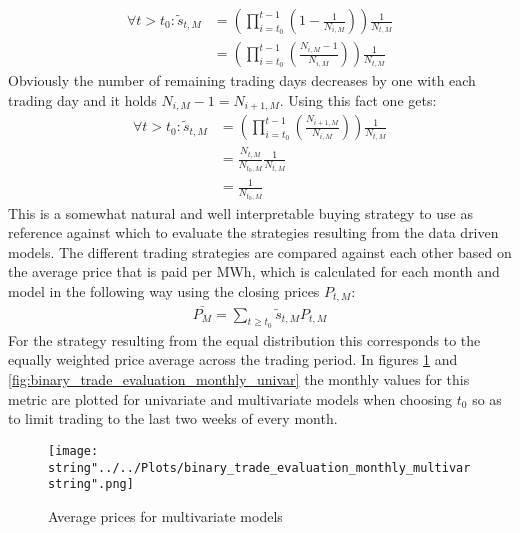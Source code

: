 \begin{align*}
\forall t > t_0: \tilde{s}_{t,M} &= (\prod_{i = t_{0}}^{t-1}(1-\frac{1}{N_{i,M}}))\frac{1}{N_{t,M}}\\
&= (\prod_{i = t_{0}}^{t-1}(\frac{N_{i,M} - 1}{N_{i,M}}))\frac{1}{N_{t,M}}
\end{align*}
Obviously the number of remaining trading days decreases by one with each trading day and it holds $N_{i,M} - 1 = N_{i+1,M}$. Using this fact one gets:
\begin{align*}
\forall t > t_0: \tilde{s}_{t,M}  &= (\prod_{i = t_{0}}^{t-1}(\frac{N_{i+1,M}}{N_{i,M}}))\frac{1}{N_{t,M}} \\
&= \frac{N_{t,M}}{N_{t_0,M}}\frac{1}{N_{t,M}}\\
&= \frac{1}{N_{t_0,M}}
\end{align*}
This is a somewhat natural and well interpretable buying strategy to  use as reference against which to evaluate the strategies resulting from the data driven models.
The different trading strategies are compared against each other based on the average price that is paid per MWh, which is calculated for each month and model in the following way using the closing prices $P_{t,M}$:
\begin{align*}
\bar{P_M} = \sum_{t \geq t_0}\tilde{s}_{t,M}P_{t,M}
\end{align*}
For the strategy resulting from the equal distribution this corresponds to the equally weighted price average across the trading period. In figures \ref{fig:binary_trade_evaluation_monthly_multivar} and \ref{fig:binary_trade_evaluation_monthly_univar} the monthly values for this metric are plotted for univariate and multivariate models when choosing $t_0$ so as to limit trading to the last two weeks of every month.

\begin{figure}[h!]
  \centering
\texttt{[image: \\string"../../Plots/binary\_trade\_evaluation\_monthly\_multivar\\string".png]}
  \caption{Average prices for multivariate models}\label{fig:binary_trade_evaluation_monthly_multivar}
\end{figure}

